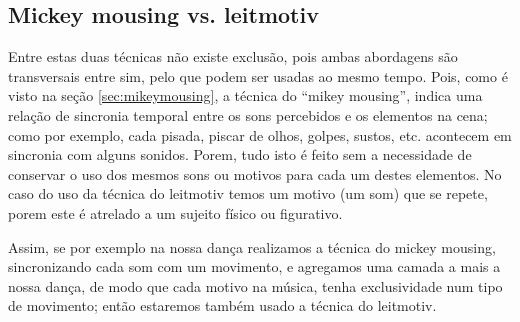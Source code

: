 \subsection{Mickey mousing vs. leitmotiv}
Entre estas duas técnicas não existe exclusão, pois ambas abordagens são transversais entre sim,
pelo que podem ser usadas ao mesmo tempo.
Pois, como é visto na seção \ref{sec:mikeymousing}, a técnica do ``mikey mousing'',
indica uma relação de sincronia temporal entre os sons percebidos e os elementos na cena;
como por exemplo, cada pisada, piscar de olhos, golpes, sustos, etc. acontecem em sincronia com alguns sonidos.
Porem, tudo isto é feito sem a necessidade de conservar o uso dos mesmos sons ou motivos para cada um destes elementos.
No caso do uso da técnica do leitmotiv temos um motivo (um som)
que se repete, porem este é atrelado a um sujeito físico ou figurativo.

Assim, se por exemplo na nossa dança realizamos a técnica do mickey mousing, 
sincronizando cada som com um movimento, 
e agregamos uma camada a mais a nossa dança, de modo que cada motivo na música, 
tenha exclusividade num tipo de movimento; então estaremos também usado a técnica do leitmotiv. 

